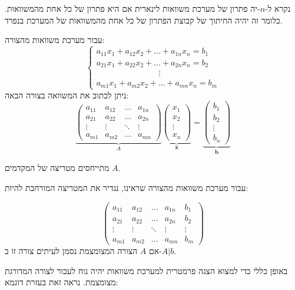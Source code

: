 \documentclass{tstextbook}
\begin{document}
\begin{definition}
נקרא ל-\(n\)-יה פתרון של מערכת משוואות לינארית אם היא פתרון של כל אחת מהמשוואות. כלומר זה יהיה החיתוך של קבוצת הפתרון של כל אחת מהמשוואות של המערכת בנפרד.

\end{definition}
עבור מערכת משוואות מהצורה:
$$\begin{cases}a_{11}x_{1}+a_{12}x_{2}+\dots+a_{1n}x_{n}=b_{1} \\a_{21}x_{1}+a_{22}x_{2}+\dots+a_{2n}x_{n}=b_{2} \\\qquad \qquad \qquad \quad \;\;\vdots \\a_{m 1}x_{1}+a_{m2}x_{2}+\dots+a_{mn}x_{n}=b_{m}
\end{cases}$$
ניתן לכתוב את המשוואה בצורה הבאה:
$$\underbrace{ \begin{pmatrix}a_{11} & a_{12} & \dots & a_{1n} \\a_{21} & a_{22} & \dots  & a_{2n} \\\vdots & \vdots & \ddots & \vdots \\a_{m 1} & a_{m 2} & \dots & a_{mn}\end{pmatrix} }_{ A }\underbrace{ \begin{pmatrix}x_{1} \\ x_{2}\\\vdots \\ x_{n}\end{pmatrix} }_{ \mathbf{x} }=\underbrace{ \begin{pmatrix}b_{1} \\ b_{2} \\ \vdots \\ b_{n}
\end{pmatrix} }_{ \mathbf{b} }$$

\begin{definition}
מתייחסים מטריצה של המקדמים \(A\). 

\end{definition}
\begin{proposition}
עבור מערכת משוואות מהצורה שראינו, נגדיר את המטריצה המורחבת להיות:

$$\left(\begin{array}{cccc|c}a_{11} & a_{12} & \dots & a_{1n} &b_{1} \\a_{21} & a_{22} & \dots  & a_{2n}  &b_{2}\\\vdots & \vdots & \ddots & \vdots & \vdots\\a_{m 1} & a_{m 2} & \dots & a_{mn} & b_{m}\end{array}\right)
$$
אם \(A\) הצורה המצומצמת נסמן לעיתים צורה זו ב-\(A|b\).

\end{proposition}
באופן כללי כדי למצוא הצגה פרמטרית למערכת משוואות יהיה נוח לעבור לצורה המדורגת מצומצמת. נראה זאת בעזרת דוגמא:
\end{document}
